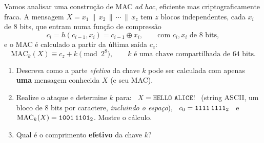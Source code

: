 \documentclass[11pt,a4paper]{article}
\begin{document}
\begin{exercicio}
Vamos analisar uma constru\c{c}\~{a}o de MAC \emph{ad hoc}, eficiente mas criptograficamente fraca. A mensagem $X = x_1 \,\|\, x_2 \,\|\, \cdots \,\|\, x_z$ tem $z$ blocos independentes, cada $x_i$ de 8 bits, que entram numa fun\c{c}\~{a}o de compress\~{a}o
\[
    c_i = h(c_{i-1}, x_i) = c_{i-1} \oplus x_i, \qquad \text{com } c_i, x_i \text{ de 8 bits},
\]
e o MAC \'{e} calculado a partir da \'{u}ltima sa\'{i}da $c_z$:
\[
    \text{MAC}_k(X) \equiv c_z + k \pmod{2^8}, \qquad k \text{ \'{e} uma chave compartilhada de 64 bits.}
\]
\begin{enumerate}[label=(\alph*)]
    \item Descreva como a parte \emph{efetiva} da chave $k$ pode ser calculada com apenas \textbf{uma} mensagem conhecida $X$ (e seu MAC).
    \item Realize o ataque e determine $k$ para: \ $X = \texttt{HELLO ALICE!}$ \ (string ASCII, um bloco de 8 bits por caractere, \emph{incluindo o espa\c{c}o}), \ $c_0 = \texttt{1111\,1111}_2$ \ e \ $\text{MAC}_k(X) = \texttt{1001\,1101}_2$. Mostre o c\'{a}lculo.
    \item Qual \'{e} o comprimento \textbf{efetivo} da chave $k$?
\end{enumerate}
\end{exercicio}
\end{document}
